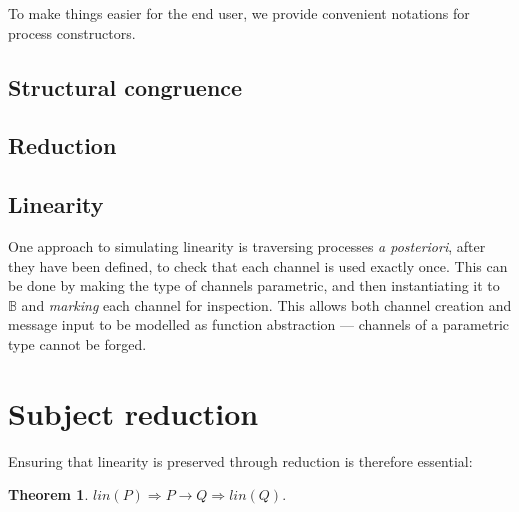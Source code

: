 \documentclass{mproj}
\newtheorem{theorem}{Theorem}
\begin{document}

To make things easier for the end user, we provide convenient notations for process constructors.


\subsection{Structural congruence}\label{structural-congruence}

\subsection{Reduction}\label{reduction}

\subsection{Linearity}\label{linearity}

One approach to simulating linearity is traversing processes \emph{a posteriori}, after they have been defined, to check that each channel is used exactly once. This can be done by making the type of channels parametric, and then instantiating it to $\mathbb{B}$ and \emph{marking} each channel for inspection. This allows both channel creation and message input to be modelled as function abstraction --- channels of a parametric type cannot be forged.


\cite{Kobayashi1999}
\cite{Toninho2011}

\section{Subject reduction}\label{subject-reduction}


Ensuring that linearity is preserved through reduction is therefore essential:
\begin{theorem}
    $lin(P) \Rightarrow P \rightarrow Q \Rightarrow lin(Q).$
\end{theorem}

\end{document}
